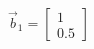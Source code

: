 \documentclass[preview]{standalone}
\begin{document}
\begin{align*}
\vec b_1=\begin{bmatrix}1\\0.5\end{bmatrix}
\end{align*}
\end{document}

